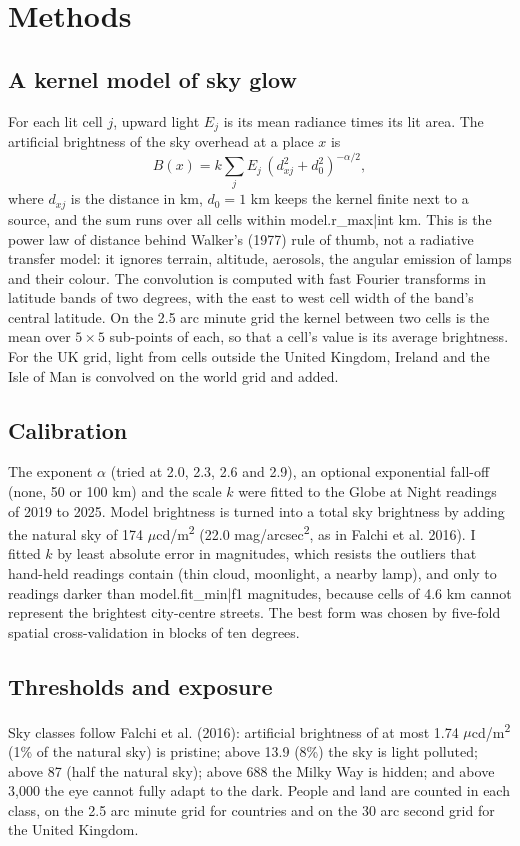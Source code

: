 \documentclass[11pt,a4paper]{article}
\begin{document}
\section{Methods}

\subsection{A kernel model of sky glow}
For each lit cell $j$, upward light $E_j$ is its mean radiance times its lit area. The artificial brightness of the sky overhead at a place $x$ is
\[ B(x) = k \sum_j E_j \, (d_{xj}^2 + d_0^2)^{-\alpha/2}, \]
where $d_{xj}$ is the distance in km, $d_0 = 1$ km keeps the kernel finite next to a source, and the sum runs over all cells within {{model.r_max|int}} km. This is the power law of distance behind Walker's (1977) rule of thumb, not a radiative transfer model: it ignores terrain, altitude, aerosols, the angular emission of lamps and their colour. The convolution is computed with fast Fourier transforms in latitude bands of two degrees, with the east to west cell width of the band's central latitude. On the 2.5 arc minute grid the kernel between two cells is the mean over $5 \times 5$ sub-points of each, so that a cell's value is its average brightness. For the UK grid, light from cells outside the United Kingdom, Ireland and the Isle of Man is convolved on the world grid and added.

\subsection{Calibration}
The exponent $\alpha$ (tried at 2.0, 2.3, 2.6 and 2.9), an optional exponential fall-off (none, 50 or 100 km) and the scale $k$ were fitted to the Globe at Night readings of 2019 to 2025. Model brightness is turned into a total sky brightness by adding the natural sky of 174 $\mu$cd/m\textsuperscript{2} (22.0 mag/arcsec\textsuperscript{2}, as in Falchi et al. 2016). I fitted $k$ by least absolute error in magnitudes, which resists the outliers that hand-held readings contain (thin cloud, moonlight, a nearby lamp), and only to readings darker than {{model.fit_min|f1}} magnitudes, because cells of 4.6 km cannot represent the brightest city-centre streets. The best form was chosen by five-fold spatial cross-validation in blocks of ten degrees.

\subsection{Thresholds and exposure}
Sky classes follow Falchi et al. (2016): artificial brightness of at most 1.74 $\mu$cd/m\textsuperscript{2} (1\% of the natural sky) is pristine; above 13.9 (8\%) the sky is light polluted; above 87 (half the natural sky); above 688 the Milky Way is hidden; and above 3,000 the eye cannot fully adapt to the dark. People and land are counted in each class, on the 2.5 arc minute grid for countries and on the 30 arc second grid for the United Kingdom.
\end{document}
